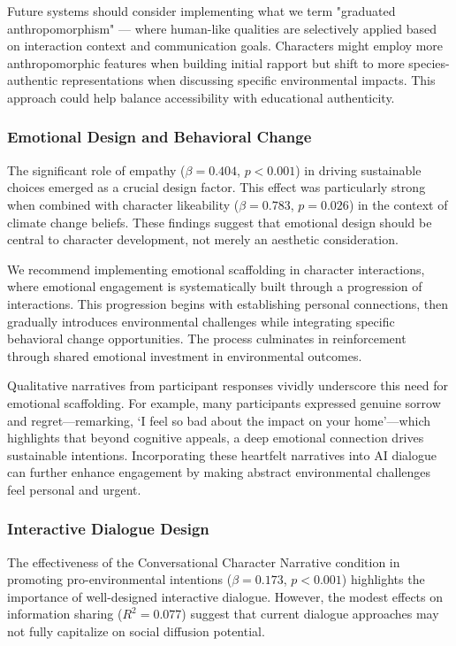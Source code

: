 \documentclass[sigconf, nonacm]{acmart}
\begin{document}
Future systems should consider implementing what we term "graduated anthropomorphism" — where human-like qualities are selectively applied based on interaction context and communication goals. Characters might employ more anthropomorphic features when building initial rapport but shift to more species-authentic representations when discussing specific environmental impacts. This approach could help balance accessibility with educational authenticity.

\subsubsection*{Emotional Design and Behavioral Change}
The significant role of empathy ($\beta = 0.404$, $p < 0.001$) in driving sustainable choices emerged as a crucial design factor. This effect was particularly strong when combined with character likeability ($\beta = 0.783$, $p = 0.026$) in the context of climate change beliefs. These findings suggest that emotional design should be central to character development, not merely an aesthetic consideration.

We recommend implementing emotional scaffolding in character interactions, where emotional engagement is systematically built through a progression of interactions. This progression begins with establishing personal connections, then gradually introduces environmental challenges while integrating specific behavioral change opportunities. The process culminates in reinforcement through shared emotional investment in environmental outcomes.

Qualitative narratives from participant responses vividly underscore this need for emotional scaffolding. For example, many participants expressed genuine sorrow and regret—remarking, ‘I feel so bad about the impact on your home’—which highlights that beyond cognitive appeals, a deep emotional connection drives sustainable intentions. Incorporating these heartfelt narratives into AI dialogue can further enhance engagement by making abstract environmental challenges feel personal and urgent.

\subsubsection*{Interactive Dialogue Design}
The effectiveness of the Conversational Character Narrative condition in promoting pro-environmental intentions ($\beta = 0.173$, $p < 0.001$) highlights the importance of well-designed interactive dialogue. However, the modest effects on information sharing ($R^2 = 0.077$) suggest that current dialogue approaches may not fully capitalize on social diffusion potential.
\end{document}
